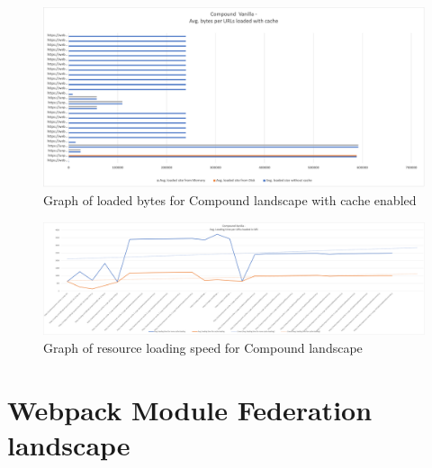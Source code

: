 \newpage
\begin{figure}[!h]
	\centering
	\includegraphics[width=1.4\textwidth, angle=90]{Figures/compound_bytes_cache.png}
	\caption{Graph of loaded bytes for Compound landscape with cache enabled}
	\label{fig:appendix_1_24}
\end{figure}
\newpage
\begin{figure}[!h]
	\centering
	\includegraphics[width=1.4\textwidth, angle=90]{Figures/compound_speed.png}
	\caption{Graph of resource loading speed for Compound landscape}
	\label{fig:appendix_1_25}
\end{figure}
\newpage

\section{Webpack Module Federation landscape}


